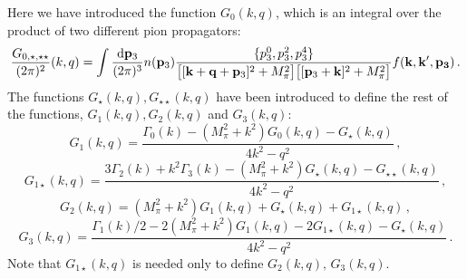 Here we have introduced the function $G_0(k,q)$, which is an integral over the product of two different pion propagators:
\begin{equation}
\frac{G_{0,\star,\star\star}}{(2\pi)^2}(k,q)=
\int \frac{{\mathrm d}{\bf p}_3}{(2\pi)^3}n({\bf p}_3)
\frac{\{p_3^0,p_3^2,p_3^4\}}{\big[[{\bf k}+{\bf q}+{\bf p}_3]^2+M_\pi^2\big]\big[[{\bf p}_3+{\bf k}]^2+M_\pi^2\big]}f({\bf k},{\bf k'},{\bf p_3})\,.
\label{G_0} 
\end{equation}
The functions $G_{\star}(k,q), G_{\star\star}(k,q)$ have been introduced to define the rest of the functions, $G_1(k,q), G_2(k,q)$ and $G_3(k,q)$:
\begin{equation}
\label{G_1}
G_1(k,q)=\frac{\Gamma_0(k)-(M_\pi^2+k^2)G_0(k,q)-G_\star(k,q)}{4k^2-q^2}\,,
\end{equation}
\begin{equation}
\label{G_1star}
G_{1\star}(k,q)=\frac{3\Gamma_2(k)+k^2\Gamma_3(k)-(M_\pi^2+k^2)G_\star(k,q)-G_{\star\star}(k,q)}{4k^2-q^2}\,,
\end{equation}
\begin{equation}
\label{G_2}
G_2(k,q)=(M_\pi^2+k^2)G_1(k,q)+G_\star(k,q)+G_{1\star}(k,q)\,,
\end{equation}
\begin{equation}
\label{G_3}
G_3(k,q)=\frac{\Gamma_1(k)/2-2(M_\pi^2+k^2)G_1(k,q)-2G_{1\star}(k,q)-G_\star(k,q)}{4k^2-q^2}\,.
\end{equation}
Note that $G_{1\star}(k,q)$ is needed only to define $G_2(k,q),\,G_3(k,q)$.\\

